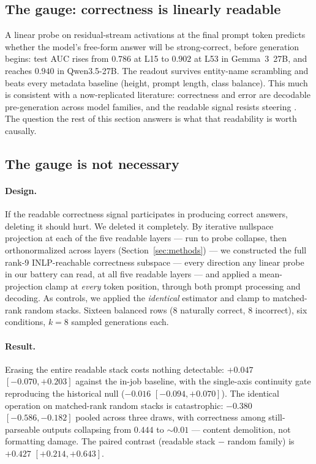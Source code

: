 \documentclass{article} %
\begin{document}
\subsection{The gauge: correctness is linearly readable}\label{sec:gauge}

A linear probe on residual-stream activations at the final prompt token
predicts whether the model's free-form answer will be strong-correct,
before generation begins: test AUC rises from $0.786$ at L15 to $0.902$
at L53 in Gemma~3~27B, and reaches $0.940$ in Qwen3.5-27B. The readout
survives entity-name scrambling and beats every metadata baseline
(height, prompt length, class balance). This much is consistent with a
now-replicated literature: correctness and error are decodable
pre-generation across model families, and the readable signal resists
steering \citep{decodable2026, detection2026, epiphenomenal2026}. The
question the rest of this section answers is what that readability is
worth causally.

\subsection{The gauge is not necessary}\label{sec:erasure}

\paragraph{Design.} If the readable correctness signal participates in
producing correct answers, deleting it should hurt. We deleted it
completely. By iterative nullspace projection at each of the five
readable layers --- run to probe collapse, then orthonormalized across
layers (Section~\ref{sec:methods}) --- we constructed the full
rank-9 INLP-reachable correctness subspace --- every direction any
linear probe in our battery can read, at all five readable layers ---
and applied a mean-projection clamp at \emph{every} token position,
through both prompt processing and decoding. As controls, we applied
the \emph{identical} estimator and clamp to matched-rank random stacks.
Sixteen balanced rows (8 naturally correct, 8 incorrect), six
conditions, $k{=}8$ sampled generations each.

\paragraph{Result.} Erasing the entire readable stack costs nothing
detectable: $+0.047$ $[-0.070, +0.203]$ against the in-job baseline,
with the single-axis continuity gate reproducing the historical null
($-0.016$ $[-0.094, +0.070]$). The identical operation on matched-rank
random stacks is catastrophic: $-0.380$ $[-0.586, -0.182]$ pooled
across three draws, with correctness among still-parseable outputs
collapsing from $0.444$ to $\sim 0.01$ --- content demolition, not
formatting damage. The paired contrast (readable stack $-$ random
family) is $+0.427$ $[+0.214, +0.643]$.
\end{document}

